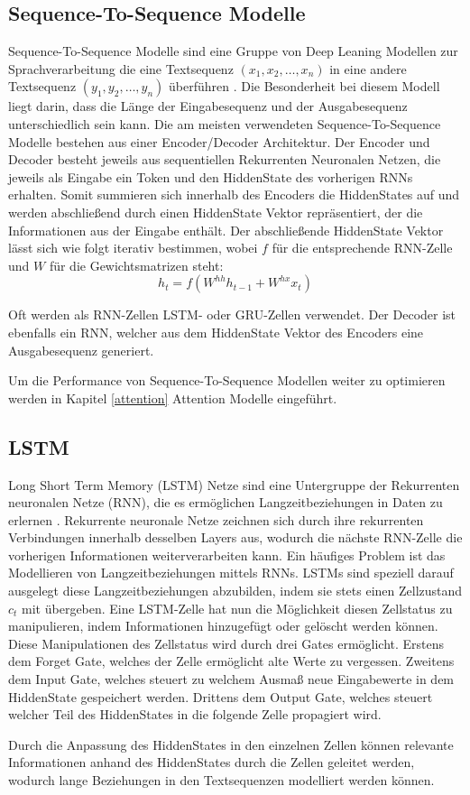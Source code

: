 \subsection{Sequence-To-Sequence Modelle}
Sequence-To-Sequence Modelle sind eine Gruppe von Deep Leaning Modellen zur Sprachverarbeitung die eine Textsequenz $(x_1,x_2,\ldots,x_n)$ in eine andere Textsequenz $(y_1,y_2,\ldots,y_n)$ überführen \citep{DBLP:journals/corr/SutskeverVL14}.
Die Besonderheit bei diesem Modell liegt darin, dass die Länge der Eingabesequenz und der Ausgabesequenz unterschiedlich sein kann.
Die am meisten verwendeten Sequence-To-Sequence Modelle bestehen aus einer Encoder/Decoder Architektur.
Der Encoder und Decoder besteht jeweils aus sequentiellen Rekurrenten Neuronalen Netzen, die jeweils als Eingabe ein Token und den HiddenState des vorherigen RNNs erhalten.
Somit summieren sich innerhalb des Encoders die HiddenStates auf und werden abschließend durch einen HiddenState Vektor repräsentiert, der die Informationen aus der Eingabe enthält.
Der abschließende HiddenState Vektor lässt sich wie folgt iterativ bestimmen, wobei $f$ für die entsprechende RNN-Zelle und $W$ für die Gewichtsmatrizen steht:
\begin{equation}
    h_t = f(W^{hh}h_{t-1}+W^{hx}x_t)
\end{equation}

Oft werden als RNN-Zellen LSTM- oder GRU-Zellen verwendet.
Der Decoder ist ebenfalls ein RNN, welcher aus dem HiddenState Vektor des Encoders eine Ausgabesequenz generiert.

Um die Performance von Sequence-To-Sequence Modellen weiter zu optimieren werden in Kapitel \ref{attention} Attention Modelle eingeführt.


\subsection{LSTM}
Long Short Term Memory (LSTM) Netze sind eine Untergruppe der Rekurrenten neuronalen Netze (RNN), die es ermöglichen Langzeitbeziehungen in Daten zu erlernen \citep{lstm}.
Rekurrente neuronale Netze zeichnen sich durch ihre rekurrenten Verbindungen innerhalb desselben Layers aus, wodurch die nächste RNN-Zelle die vorherigen Informationen weiterverarbeiten kann.
Ein häufiges Problem ist das Modellieren von Langzeitbeziehungen mittels RNNs. 
LSTMs sind speziell darauf ausgelegt diese Langzeitbeziehungen abzubilden, indem sie stets einen Zellzustand $c_t$ mit übergeben.
Eine LSTM-Zelle hat nun die Möglichkeit diesen Zellstatus zu manipulieren, indem Informationen hinzugefügt oder gelöscht werden können.
Diese Manipulationen des Zellstatus wird durch drei Gates ermöglicht. 
Erstens dem Forget Gate, welches der Zelle ermöglicht alte Werte zu vergessen.
Zweitens dem Input Gate, welches steuert zu welchem Ausmaß neue Eingabewerte in dem HiddenState gespeichert werden.
Drittens dem Output Gate, welches steuert welcher Teil des HiddenStates in die folgende Zelle propagiert wird.

Durch die Anpassung des HiddenStates in den einzelnen Zellen können relevante Informationen anhand des HiddenStates durch die Zellen geleitet werden, wodurch lange Beziehungen in den Textsequenzen modelliert werden können.


\pagebreak
